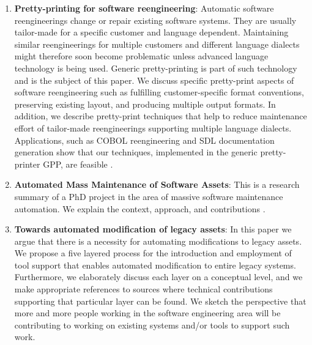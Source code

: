\begin{englishtext}
\begin{enumerate}
    \item \textbf{Pretty-printing for software reengineering}: Automatic
    software reengineerings change or repair existing software systems. They are
    usually tailor-made for a specific customer and language dependent.
    Maintaining similar reengineerings for multiple customers and different
    language dialects might therefore soon become problematic unless advanced
    language technology is being used. Generic pretty-printing is part of such
    technology and is the subject of this paper. We discuss specific
    pretty-print aspects of software reengineering such as fulfilling
    customer-specific format conventions, preserving existing layout, and
    producing multiple output formats. In addition, we describe pretty-print
    techniques that help to reduce maintenance effort of tailor-made
    reengineerings supporting multiple language dialects. Applications, such as
    COBOL reengineering and SDL documentation generation show that our
    techniques, implemented in the generic pretty-printer GPP, are feasible
    \cite{prettyPrinting}.

    \item \textbf{Automated Mass Maintenance of Software Assets}: This is a
    research summary of a PhD project in the area of massive software
    maintenance automation. We explain the context, approach, and contributions
    \cite{massMaintenance}.

    \item \textbf{Towards automated modification of legacy assets}: In this
    paper we argue that there is a necessity for automating modifications to
    legacy assets. We propose a five layered process for the introduction and
    employment of tool support that enables automated modification to entire
    legacy systems. Furthermore, we elaborately discuss each layer on a
    conceptual level, and we make appropriate references to sources where
    technical contributions supporting that particular layer can be found. We
    sketch the perspective that more and more people working in the software
    engineering area will be contributing to working on existing systems and/or
    tools to support such work. \cite{legacyAssets}


\end{enumerate}
\end{englishtext}
